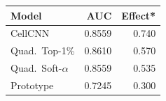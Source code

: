 \begin{tabular}{@{}lrr@{}}\toprule
Model & AUC & Effect*\\\midrule
CellCNN & 0.8559 & 0.740\\
Quad.\ Top-1\% & 0.8610 & 0.570\\
Quad.\ Soft-$\alpha$ & 0.8559 & 0.535\\
Prototype & 0.7245 & 0.300\\
\bottomrule\end{tabular}
\par{}
